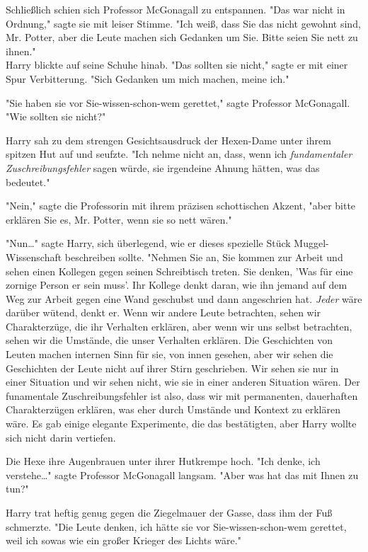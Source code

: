 {Schließlich schien sich Professor McGonagall zu entspannen. "Das war nicht in Ordnung," sagte sie mit leiser Stimme. "Ich weiß, dass Sie das nicht gewohnt sind, Mr. Potter, aber die Leute machen sich Gedanken um Sie. Bitte seien Sie nett zu ihnen."\\ Harry blickte auf seine Schuhe hinab. "Das sollten sie nicht," sagte er mit einer Spur Verbitterung. "Sich Gedanken um mich machen, meine ich."

"Sie haben sie vor Sie-wissen-schon-wem gerettet," sagte Professor McGonagall. "Wie sollten sie nicht?"

Harry sah zu dem strengen Gesichtsausdruck der Hexen-Dame unter ihrem spitzen Hut auf und seufzte. "Ich nehme nicht an, dass, wenn ich \emph{fundamentaler Zuschreibungsfehler} sagen würde, sie irgendeine Ahnung hätten, was das bedeutet."

"Nein," sagte die Professorin mit ihrem präzisen schottischen Akzent, "aber bitte erklären Sie es, Mr. Potter, wenn sie so nett wären."

"Nun…" sagte Harry, sich überlegend, wie er dieses spezielle Stück Muggel-Wissenschaft beschreiben sollte. "Nehmen Sie an, Sie kommen zur Arbeit und sehen einen Kollegen gegen seinen Schreibtisch treten. Sie denken, 'Was für eine zornige Person er sein muss'. Ihr Kollege denkt daran, wie ihn jemand auf dem Weg zur Arbeit gegen eine Wand geschubst und dann angeschrien hat. \emph{Jeder} wäre darüber wütend, denkt er. Wenn wir andere Leute betrachten, sehen wir Charakterzüge, die ihr Verhalten erklären, aber wenn wir uns selbst betrachten, sehen wir die Umstände, die unser Verhalten erklären. Die Geschichten von Leuten machen internen Sinn für sie, von innen gesehen, aber wir sehen die Geschichten der Leute nicht auf ihrer Stirn geschrieben. Wir sehen sie nur in einer Situation und wir sehen nicht, wie sie in einer anderen Situation wären. Der funamentale Zuschreibungsfehler ist also, dass wir mit permanenten, dauerhaften Charakterzügen erklären, was eher durch Umstände und Kontext zu erklären wäre. Es gab einige elegante Experimente, die das bestätigten, aber Harry wollte sich nicht darin vertiefen.

Die Hexe ihre Augenbrauen unter ihrer Hutkrempe hoch. "Ich denke, ich verstehe…" sagte Professor McGonagall langsam. "Aber was hat das mit Ihnen zu tun?"

Harry trat heftig genug gegen die Ziegelmauer der Gasse, dass ihm der Fuß schmerzte. "Die Leute denken, ich hätte sie vor Sie-wissen-schon-wem gerettet, weil ich sowas wie ein großer Krieger des Lichts wäre."

}
